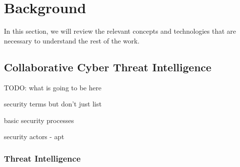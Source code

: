 \chapter{Background}
In this section, we will review the relevant concepts and technologies that are necessary to understand the rest of the work.

\section{Collaborative Cyber Threat Intelligence}
TODO: what is going to be here

security terms but don't just list

basic security processes


security actors
- \Gls{apt}

\subsection{Threat Intelligence}

\section{}